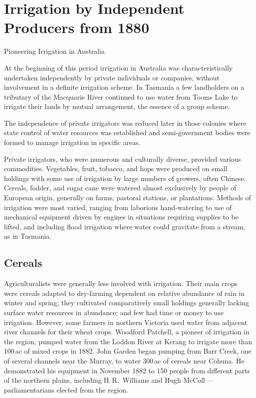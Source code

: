 
\setcounter{endnote}{0}
 
\chapter{Irrigation by Independent Producers from 1880}
\label{ch:indep}
%
{Pioneering Irrigation in Australia}

At the beginning of this period irrigation in Australia was
characteristically undertaken independently by private individuals or
companies, without involvement in a definite irrigation scheme.  In
Tasmania a few landholders on a tributary of the Macquarie River
continued to use water from Tooms Lake to irrigate their lands by
mutual arrangement, the essence of a group scheme.

The independence of private irrigators was reduced later in those
colonies where state control of water resources was established and
semi-government bodies were formed to manage irrigation in specific
areas.

Private irrigators, who were numerous and culturally diverse, provided
various commodities.  Vegetables, fruit, tobacco, and hops were
produced on small holdings with some use of irrigation by large
numbers of growers, often Chinese.  Cereals, fodder, and sugar cane
were watered almost exclusively by people of European origin,
generally on farms, pastoral stations, or plantations.  Methods of
irrigation were most varied, ranging from laborious hand-watering to
use of mechanical equipment driven by engines in situations requiring
supplies to be lifted, and including flood irrigation where water
could gravitate from a stream, as in Tasmania.

\section*{Cereals}

Agriculturalists were generally less involved with irrigation. Their
main crops were cereals adapted to dry-farming dependent on relative
abundance of rain in winter and spring; they cultivated comparatively
small holdings generally lacking surface water resources in abundance;
and few had time or money to use irrigation.  However, some farmers in
northern Victoria used water from adjacent river channels for their
wheat crops.  Woodford Patchell, a pioneer of irrigation in the
region, pumped water from the Loddon River at Kerang to irrigate more
than 100\,ac of mixed crops in 1882. John Garden began pumping from
Barr Creek, one of several channels near the Murray, to water 300\,ac
of cereals near Cohuna.  He demonstrated his equipment in November
1882 to 150 people from different parts of the northern plains,
including H.\,R.~Williams and Hugh McColl\,---\,parliamentarians elected
from the region.


